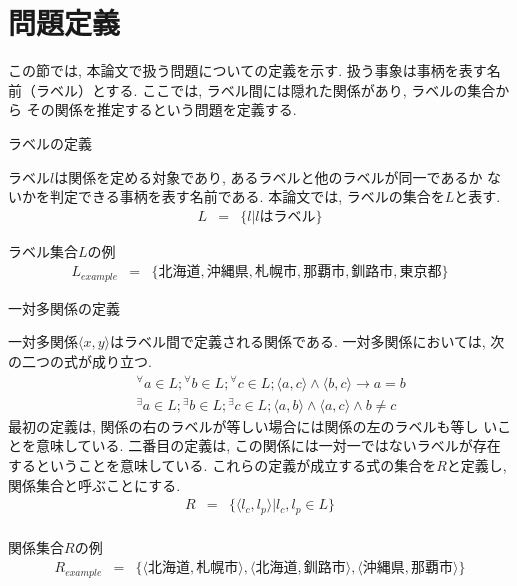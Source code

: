 \section{問題定義}
この節では, 本論文で扱う問題についての定義を示す. 
扱う事象は事柄を表す名前（ラベル）とする. 
ここでは, ラベル間には隠れた関係があり, ラベルの集合から
その関係を推定するという問題を定義する. 
\begin{df} ラベルの定義

ラベル$l$は関係を定める対象であり, あるラベルと他のラベルが同一であるか
ないかを判定できる事柄を表す名前である. 
本論文では, ラベルの集合を$L$と表す. 
\begin{eqnarray*}
L&=&\{l|lはラベル\}
\end{eqnarray*}
\end{df}
\begin{ex} ラベル集合$L$の例
\begin{eqnarray*}
L_{example} &=& \{ 北海道, 沖縄県, 札幌市, 那覇市, 釧路市, 東京都\} 
\end{eqnarray*}
\end{ex}
\begin{df} 一対多関係の定義

一対多関係$\langle x,y\rangle$はラベル間で定義される関係である. 
一対多関係においては, 次の二つの式が成り立つ. 
\begin{eqnarray*}
&& {}^{\forall} a \in L ; {}^{\forall} b \in L; {}^{\forall} c \in L; 
\langle a,c \rangle \wedge \langle b,c\rangle \rightarrow a=b\\
&& {}^{\exists} a \in L ; {}^{\exists} b \in L ; {}^{\exists} c \in L; 
\langle a,b\rangle \wedge \langle a,c\rangle \wedge b\neq c
\end{eqnarray*}
最初の定義は, 関係の右のラベルが等しい場合には関係の左のラベルも等し
いことを意味している. 
二番目の定義は, この関係には一対一ではないラベルが存在するということを意味している. 
これらの定義が成立する式の集合を$R$と定義し, 関係集合と呼ぶことにする. 
\begin{eqnarray*}
R&=&\{\langle l_c,l_p \rangle|l_c,l_p\in L\}\\
\end{eqnarray*}
\end{df}
\begin{ex} 関係集合$R$の例
\begin{eqnarray*}
R_{example} &=& \{ \langle 北海道, 札幌市\rangle, \langle 北海道, 釧路市\rangle, \langle 沖縄県, 那覇市\rangle \}
\end{eqnarray*}
\end{ex}
